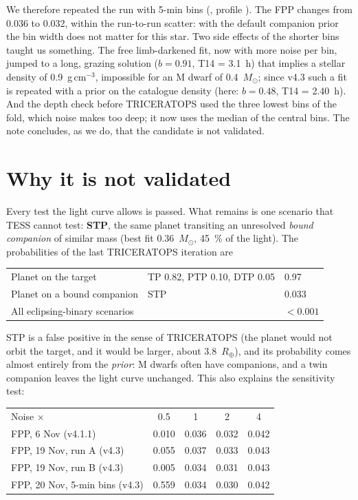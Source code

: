 We therefore repeated the run with 5-min bins (,
profile ). The FPP changes from 0.036 to
0.032, within the run-to-run scatter: with the default companion prior the
bin width does not matter for this star. Two side effects of the shorter
bins taught us something. The free limb-darkened fit, now with more noise
per bin, jumped to a long, grazing solution ($b = 0.91$, T14 = 3.1~h)
that implies a stellar density of 0.9~g\,cm$^{-3}$, impossible for an M
dwarf of 0.4~$M_\odot$; since v4.3 such a fit is repeated with a prior on
the catalogue density (here: $b = 0.48$, T14 = 2.40~h). And the depth check
before TRICERATOPS used the three lowest bins of the fold, which noise makes
too deep; it now uses the median of the central bins. The note concludes,
as we do, that the candidate is not validated.

\section*{Why it is not validated}

Every test the light curve allows is passed. What remains is one scenario
that TESS cannot test: \textbf{STP}, the same planet transiting an
unresolved \emph{bound companion} of similar mass (best fit 0.36~$M_\odot$,
45~\% of the light). The probabilities of the last TRICERATOPS iteration are

\begin{center}
\begin{tabular}{@{}lll@{}}
\toprule
Planet on the target & TP 0.82, PTP 0.10, DTP 0.05 & 0.97\\
Planet on a bound companion & STP & 0.033\\
All eclipsing-binary scenarios & & $< 0.001$\\
\bottomrule
\end{tabular}
\end{center}

STP is a false positive in the sense of TRICERATOPS (the planet would not
orbit the target, and it would be larger, about 3.8~$R_\oplus$), and its
probability comes almost entirely from the \emph{prior}: M dwarfs often have
companions, and a twin companion leaves the light curve unchanged. This
also explains the sensitivity test:

\begin{center}
\begin{tabular}{@{}lcccc@{}}
\toprule
Noise $\times$ & 0.5 & 1 & 2 & 4\\
FPP, 6 Nov (v4.1.1) & 0.010 & 0.036 & 0.032 & 0.042\\
FPP, 19 Nov, run A (v4.3) & 0.055 & 0.037 & 0.033 & 0.043\\
FPP, 19 Nov, run B (v4.3) & 0.005 & 0.034 & 0.031 & 0.043\\
FPP, 20 Nov, 5-min bins (v4.3) & 0.559 & 0.034 & 0.030 & 0.042\\
\bottomrule
\end{tabular}
\end{center}

